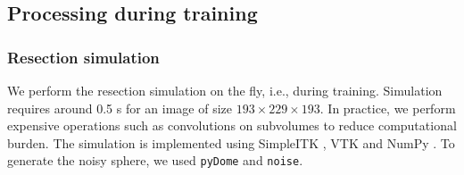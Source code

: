 \subsection{Processing during training}

\subsubsection{Resection simulation}

We perform the resection simulation on the fly, i.e., during training.
Simulation requires around 0.5 s for an image of size $193 \times 229 \times 193$.%
In practice, we perform expensive operations such as convolutions on subvolumes to reduce computational burden.
The simulation is implemented using SimpleITK \cite{lowekamp_design_2013}, VTK \cite{schroeder_visualization_2006} and NumPy \cite{van_der_walt_numpy_2011}.
To generate the noisy sphere, we used \texttt{pyDome} and \texttt{noise}.


